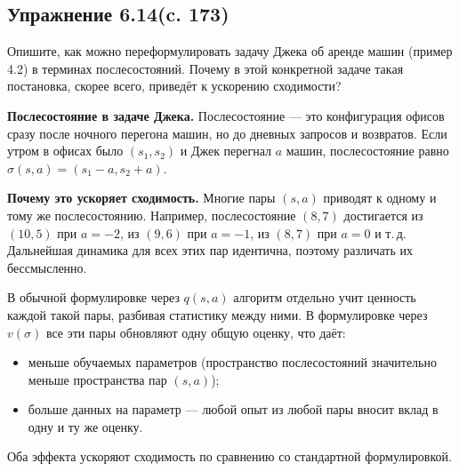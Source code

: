 \subsection{Упражнение 6.14(c. 173)}
Опишите, как можно переформулировать задачу Джека об аренде машин (пример 4.2) в терминах послесостояний. Почему в этой конкретной задаче такая постановка, скорее всего, приведёт к ускорению сходимости?
\begin{solution}
    \textbf{Послесостояние в задаче Джека.} Послесостояние — это конфигурация офисов сразу после ночного перегона машин, но до дневных запросов и возвратов. Если утром в офисах было $(s_1, s_2)$ и Джек перегнал $a$ машин, послесостояние равно $\sigma(s, a) = (s_1 - a, s_2 + a)$.

    \textbf{Почему это ускоряет сходимость.} Многие пары $(s, a)$ приводят к одному и тому же послесостоянию. Например, послесостояние $(8, 7)$ достигается из $(10, 5)$ при $a = -2$, из $(9, 6)$ при $a = -1$, из $(8, 7)$ при $a = 0$ и т.\,д. Дальнейшая динамика для всех этих пар идентична, поэтому различать их бессмысленно.

    В обычной формулировке через $q(s, a)$ алгоритм отдельно учит ценность каждой такой пары, разбивая статистику между ними. В формулировке через $v(\sigma)$ все эти пары обновляют одну общую оценку, что даёт:
    \begin{itemize}
        \item меньше обучаемых параметров (пространство послесостояний значительно меньше пространства пар $(s, a)$);
        \item больше данных на параметр — любой опыт из любой пары вносит вклад в одну и ту же оценку.
    \end{itemize}
    Оба эффекта ускоряют сходимость по сравнению со стандартной формулировкой.
\end{solution}
